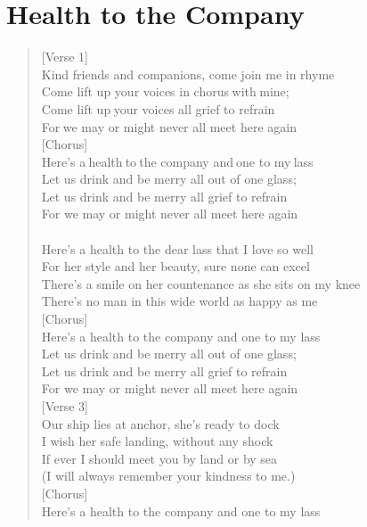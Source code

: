 \documentclass[11pt]{article}
\begin{document}
\section{Health to the Company}
\label{sec:org059f0fd}
\begin{verse}
[Verse 1]\\
Kind friends and companions, come join me in rhyme\\
Come lift up your voices in chorus with mine;\\
Come lift up your voices all grief to refrain\\
For we may or might never all meet here again\\
\vspace*{1em}
[Chorus]\\
Here's a health to the company and one to my lass\\
Let us drink and be merry all out of one glass;\\
Let us drink and be merry all grief to refrain\\
For we may or might never all meet here again\\
[Verse 2]\\
Here's a health to the dear lass that I love so well\\
For her style and her beauty, sure none can excel\\
There's a smile on her countenance as she sits on my knee\\
There's no man in this wide world as happy as me\\
\vspace*{1em}
[Chorus]\\
Here's a health to the company and one to my lass\\
Let us drink and be merry all out of one glass;\\
Let us drink and be merry all grief to refrain\\
For we may or might never all meet here again\\
\vspace*{1em}
[Verse 3]\\
Our ship lies at anchor, she's ready to dock\\
I wish her safe landing, without any shock\\
If ever I should meet you by land or by sea\\
(I will always remember your kindness to me.)\\
\vspace*{1em}
[Chorus]\\
Here's a health to the company and one to my lass\\

\end{verse}
\end{document}
